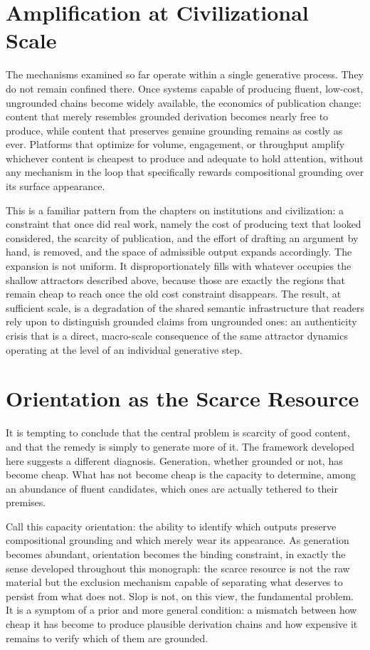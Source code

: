 \documentclass[11pt,oneside]{book}
\theoremstyle{plain}
\theoremstyle{definition}
\theoremstyle{remark}
\begin{document}
\section{Amplification at Civilizational Scale}

The mechanisms examined so far operate within a single generative process. They do not remain confined there. Once systems capable of producing fluent, low-cost, ungrounded chains become widely available, the economics of publication change: content that merely resembles grounded derivation becomes nearly free to produce, while content that preserves genuine grounding remains as costly as ever. Platforms that optimize for volume, engagement, or throughput amplify whichever content is cheapest to produce and adequate to hold attention, without any mechanism in the loop that specifically rewards compositional grounding over its surface appearance.

This is a familiar pattern from the chapters on institutions and civilization: a constraint that once did real work, namely the cost of producing text that looked considered, the scarcity of publication, and the effort of drafting an argument by hand, is removed, and the space of admissible output expands accordingly. The expansion is not uniform. It disproportionately fills with whatever occupies the shallow attractors described above, because those are exactly the regions that remain cheap to reach once the old cost constraint disappears. The result, at sufficient scale, is a degradation of the shared semantic infrastructure that readers rely upon to distinguish grounded claims from ungrounded ones: an authenticity crisis that is a direct, macro-scale consequence of the same attractor dynamics operating at the level of an individual generative step.

\section{Orientation as the Scarce Resource}

It is tempting to conclude that the central problem is scarcity of good content, and that the remedy is simply to generate more of it. The framework developed here suggests a different diagnosis. Generation, whether grounded or not, has become cheap. What has not become cheap is the capacity to determine, among an abundance of fluent candidates, which ones are actually tethered to their premises.

Call this capacity orientation: the ability to identify which outputs preserve compositional grounding and which merely wear its appearance. As generation becomes abundant, orientation becomes the binding constraint, in exactly the sense developed throughout this monograph: the scarce resource is not the raw material but the exclusion mechanism capable of separating what deserves to persist from what does not. Slop is not, on this view, the fundamental problem. It is a symptom of a prior and more general condition: a mismatch between how cheap it has become to produce plausible derivation chains and how expensive it remains to verify which of them are grounded.
\end{document}
